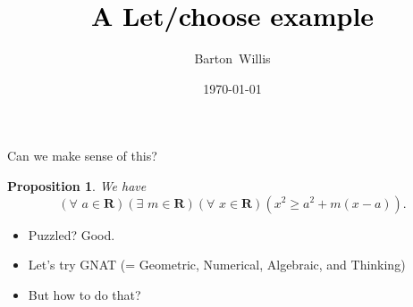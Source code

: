 \documentclass[usenames,dvipsnames,fleqn,leqno,10pt, pdflatex]{beamer}
\title[A CAS operator package] %
{\textcolor{black}{\textbf{A Let/choose example}} \\ 
\vspace{0.2in}
}
\date{\today}
\author[] %
{Barton~Willis}
\institute[UNK] %
{
    Barton Willis \\
    Department of Mathematics and Statistics\\
    University Nebraska at Kearney  \\
    Kearney, Nebraska 68849  USA \\
    \phantom{xxxx}\\
    \href{mailto:willisb@unk.edu}{willisb@unk.edu}}
\newcommand{\reals}{\mathbf{R}}
\newtheorem{myprop}{Proposition}
\begin{document}
\frame{\titlepage}

\begin{frame}{Can we make sense of this?}

\begin{myprop}
We have
\begin{equation*}
    \left(\forall \,\, a \in \reals\right)\left(\exists \,\,  m \in \reals\right)\left (\forall \,\, x \in \reals \right)\left(x^2 \geq a^2 + m (x-a) \right).
\end{equation*}
\end{myprop}

\begin{itemize}
    \item Puzzled? Good.
    \item Let's try GNAT (= Geometric, Numerical, Algebraic, and Thinking)
    \item But how to do that?
 \end{itemize}

\vfill

\end{frame}
\end{document}
